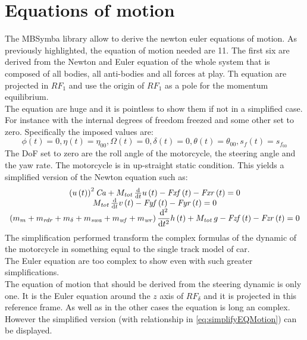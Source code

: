\section{Equations of motion}
%
The MBSymba library\cite{multibod60:online} allow to derive the newton euler equations of motion. As previously highlighted, the equation of motion needed are 11.
The first six are derived from the Newton and Euler equation of the whole system that is composed of all bodies, all anti-bodies and all forces at play. Th equation are projected in $RF_1$ and use the origin of $RF_1$ as a pole for the momentum equilibrium.\\ 
The equation are huge and it is pointless to show them if not in a simplified case. For instance with the internal degrees of freedom freezed and some other set to zero. Specifically the imposed values are:
%
\begin{equation}
    \label{eq:simplifyEQMotion}
    \phi(t) = 0, \eta(t)=\eta_00, \Omega(t) = 0, \delta(t) = 0, \theta(t) = \theta_00, s_f(t)=s_{f_{00}}
\end{equation}
%
The DoF set to zero are the roll angle of the motorcycle, the steering angle and the yaw rate. The motorcycle is in up-straight static condition. 
This yields a simplified version of the Newton equation such as:
%
\begin{equation}
\begin{array}{c}
\left( u \left( t \right)  \right) ^{2}{\it Ca}+M_{{\it tot}}\,{\frac {\rm d}{{\rm d}t}}u \left( t \right) -{\it Fxf} \left( t \right) -{\it Fxr} \left( t \right) = 0 \\
M_{{\it tot}}\,{\frac {\rm d}{{\rm d}t}}v \left( t \right) -{\it Fyf} \left( t \right) -{\it Fyr} \left( t \right) = 0\\
\displaystyle \left( m_{m}+m_{{\it rdr}}+m_{\delta}+m_{{\it swa}}+m_{{\it wf}}+m_{{\it wr}} \right) {\frac {{\rm d}^{2}}{{\rm d}{t}^{2}}}h \left( t \right) +M_{{\it tot}}\,g-{\it Fzf} \left( t \right) -{\it Fzr} \left( t \right) = 0
\end{array}
\end{equation}
%
The simplification performed transform the complex formulas of the dynamic of the motorcycle in something equal to the single track model of car.\\
The Euler equation are too complex to show even with such greater simplifications.\\
The equation of motion that should be derived from the steering dynamic is only one. It is the Euler equation around the $z$ axis of $RF_\delta$ and it is projected in this reference frame. As well as in the other cases the equation is long an complex. However the simplified version (with relationship in \ref{eq:simplifyEQMotion}) can be displayed.
